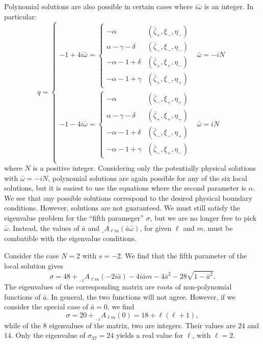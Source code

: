 \documentclass[11pt]{article}
\newcommand{\scA}[4][]{{}_{{}_{#2}}A^{#1}_{#3}(#4)}
\begin{document}
Polynomial solutions are also possible in certain cases where
$i\bar\omega$ is an integer.  In particular:
\begin{equation}
  q= \left\{\begin{array}{lc}
  -1+4i\bar\omega = \left\{\begin{array}{cc}
            -\alpha & (\bar\zeta_+,\xi_\minus,\eta_\minus) \\
            \alpha-\gamma-\delta & (\bar\zeta_\minus,\xi_\minus,\eta_\minus) \\
            -\alpha-1+\delta & (\bar\zeta_+,\xi_+,\eta_-) \\
            -\alpha-1+\gamma & (\bar\zeta_+,\xi_\minus,\eta_+)
  \end{array}\right. & \bar\omega=-iN \\
  -1-4i\bar\omega = \left\{\begin{array}{cc}
            -\alpha & (\bar\zeta_\minus,\xi_+,\eta_+) \\
            \alpha-\gamma-\delta & (\bar\zeta_+,\xi_+,\eta_+) \\
            -\alpha-1+\delta & (\bar\zeta_\minus,\xi_\minus,\eta_+) \\
            -\alpha-1+\gamma & (\bar\zeta_\minus,\xi_+,\eta_\minus)
  \end{array}\right. & \bar\omega=iN \\
\end{array}\right.
\end{equation}
where $N$ is a positive integer.  Considering only the potentially
physical solutions with $\bar\omega=-iN$, polynomial solutions are
again possible for any of the six local solutions, but it is easiest
to use the equations where the second parameter is $\alpha$.  We see
that any possible solutions correspond to the desired physical
boundary conditions.  However, solutions are not guaranteed.  We must
still satisfy the eigenvalue problem for the ``fifth parameger''
$\sigma$, but we are no longer free to pick $\bar\omega$.  Instead,
the values of $\bar{a}$ and $\scA{s}{\ell{m}}{\bar{a}\bar\omega}$, for
given $\ell$ and $m$, must be combatible with the eigenvalue conditions.

Consider the case $N=2$ with $s=-2$.  We find that the fifth parameter
of the local solution gives
\begin{equation}
  \sigma = 48+\scA{-2}{\ell{m}}{-2i\bar{a}}-4i\bar{a}m -4\bar{a}^2
           -28\sqrt{1-\bar{a}^2}.
\end{equation}
The eigenvalues of the corresponding matrix are roots of
non-polynomial functions of $\bar{a}$.  In general, the two functions
will not agree.  However, if we consider the special case of
$\bar{a}=0$, we find
\begin{equation}
  \sigma = 20+\scA{-2}{\ell{m}}{0} = 18+\ell(\ell+1),
\end{equation}
while of the 8 eigenvalues of the matrix, two are integers.  Their
values are $24$ and $14$.  Only the eigenvalue of $\sigma_{37}=24$
yields a real value for $\ell$, with $\ell=2$.
\end{document}
